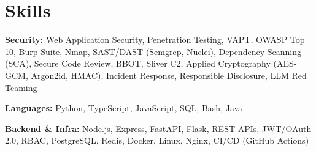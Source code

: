 \documentclass[10pt, a4paper]{article}
\begin{document}
\section{Skills}
\textbf{Security:} Web Application Security, Penetration Testing, VAPT, OWASP Top 10, Burp Suite, Nmap, SAST/DAST (Semgrep, Nuclei), Dependency Scanning (SCA), Secure Code Review, BBOT, Sliver C2, Applied Cryptography (AES-GCM, Argon2id, HMAC), Incident Response, Responsible Disclosure, LLM Red Teaming\par
\textbf{Languages:} Python, TypeScript, JavaScript, SQL, Bash, Java\par
\textbf{Backend \& Infra:} Node.js, Express, FastAPI, Flask, REST APIs, JWT/OAuth 2.0, RBAC, PostgreSQL, Redis, Docker, Linux, Nginx, CI/CD (GitHub Actions)
\end{document}
